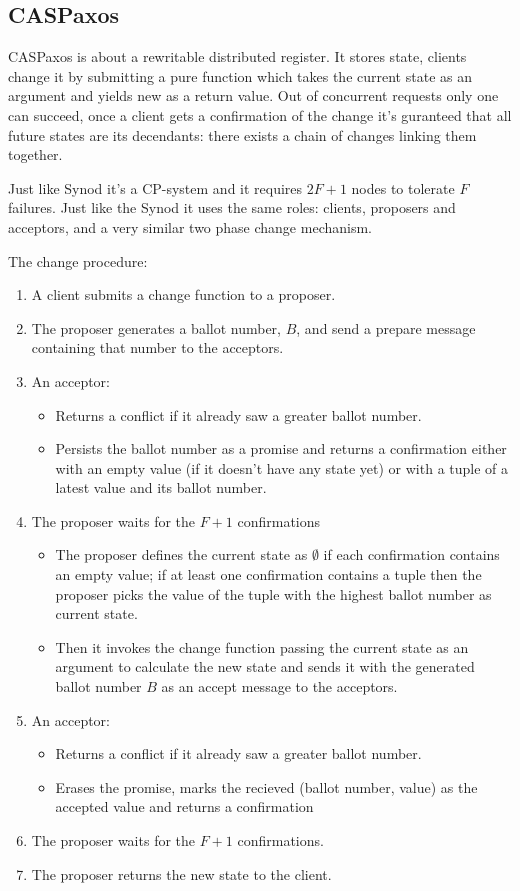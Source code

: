 \documentclass[12pt]{article}
\begin{document}
\subsection{CASPaxos}

CASPaxos is about a rewritable distributed register. It stores state, clients change it by submitting a pure function which takes the current state as an argument and yields new as a return value. Out of concurrent requests only one can succeed, once a client gets a confirmation of the change it's guranteed that all future states are its decendants: there exists a chain of changes linking them together.

Just like Synod it's a CP-system and it requires $2F+1$ nodes to tolerate $F$ failures. Just like the Synod it uses the same roles: clients, proposers and acceptors, and a very similar two phase change mechanism.

The change procedure:
\begin{enumerate}
  \item A client submits a change function to a proposer.
  \item The proposer generates a ballot number, $B$, and send a prepare message containing that number to the acceptors.
  \item An acceptor:
  \begin{itemize}
    \item Returns a conflict if it already saw a greater ballot number.
    \item Persists the ballot number as a promise and returns a confirmation either with an empty value (if it doesn't have any state yet) or with a tuple of a latest value and its ballot number.
  \end{itemize}
  \item The proposer waits for the $F+1$ confirmations
  \begin{itemize}
    \item The proposer defines the current state as $\emptyset$ if each confirmation contains an empty value; if at least one confirmation contains a tuple then the proposer picks the value of the tuple with the highest ballot number as current state.
    \item Then it invokes the change function passing the current state as an argument to calculate the new state and sends it with the generated ballot number $B$ as an accept message to the acceptors.
  \end{itemize}
  \item An acceptor:
  \begin{itemize}
    \item Returns a conflict if it already saw a greater ballot number.
    \item Erases the promise, marks the recieved (ballot number, value) as the accepted value and returns a confirmation
  \end{itemize}
  \item The proposer waits for the $F+1$ confirmations.
  \item The proposer returns the new state to the client.
\end{enumerate}
\end{document}
